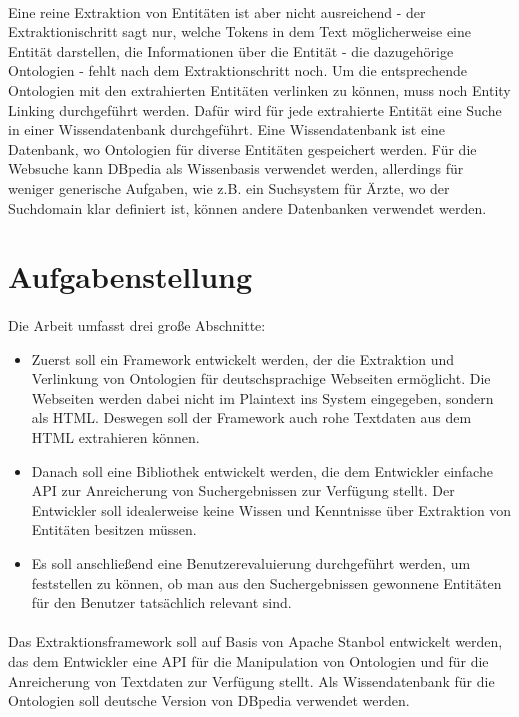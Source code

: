 \paragraph{}
Eine reine Extraktion von Entitäten ist aber nicht ausreichend - der Extraktionischritt sagt nur, welche Tokens in dem Text möglicherweise eine Entität darstellen, die Informationen über die Entität - die dazugehörige Ontologien - fehlt nach dem Extraktionschritt noch. Um die entsprechende Ontologien mit den extrahierten Entitäten verlinken zu können, muss noch Entity Linking durchgeführt werden. Dafür wird für jede extrahierte Entität eine Suche in einer Wissendatenbank durchgeführt. Eine Wissendatenbank ist eine Datenbank, wo Ontologien für diverse Entitäten gespeichert werden. Für die Websuche kann DBpedia als Wissenbasis verwendet werden, allerdings für weniger generische Aufgaben, wie z.B. ein Suchsystem für Ärzte, wo der Suchdomain klar definiert ist, können andere Datenbanken verwendet werden.

\section{Aufgabenstellung}
\label{sec:Aufgabenstellung}
\paragraph{}
Die Arbeit umfasst drei große Abschnitte: 
\begin{itemize}
\item Zuerst soll ein Framework entwickelt werden, der die Extraktion und Verlinkung von Ontologien für deutschsprachige Webseiten ermöglicht. Die Webseiten werden dabei nicht im Plaintext ins System eingegeben, sondern als HTML. Deswegen soll der Framework auch rohe Textdaten aus dem HTML extrahieren können. 

\item Danach soll eine Bibliothek entwickelt werden, die dem Entwickler einfache API zur Anreicherung von Suchergebnissen zur Verfügung stellt. Der Entwickler soll idealerweise keine Wissen und Kenntnisse über Extraktion von Entitäten besitzen müssen.

\item Es soll anschließend eine Benutzerevaluierung durchgeführt werden, um feststellen zu können, ob man aus den Suchergebnissen gewonnene Entitäten für den Benutzer tatsächlich relevant sind.
\end{itemize}

\paragraph{}
Das Extraktionsframework soll auf Basis von Apache Stanbol entwickelt werden, das dem Entwickler eine API für die Manipulation von Ontologien und für die Anreicherung von Textdaten zur Verfügung stellt. Als Wissendatenbank für die Ontologien soll deutsche Version von DBpedia verwendet werden.

